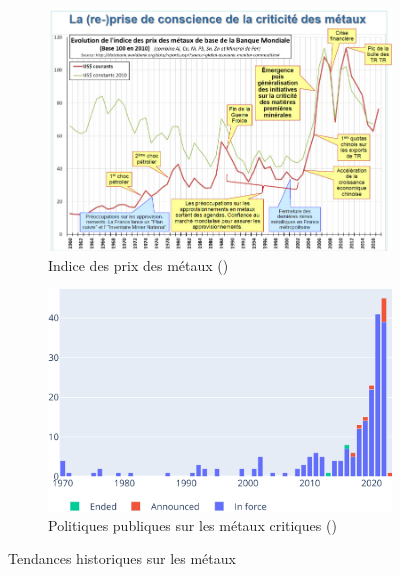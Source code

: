 \begin{figure}[!b]
    \centering
    \begin{subfigure}[b]{0.48\textwidth}
        \centering
         \includegraphics[width=\textwidth]{Images/Metals_policies/indice_metal.jpg}
         \caption{Indice des prix des métaux (\cite{brgm_substances_2022})}
         \label{fig:indices_metal}
    \end{subfigure}
    \hfill
    \begin{subfigure}[b]{0.48\textwidth}
        \centering
         \includegraphics[width=\textwidth]{Images/Metals_policies/critical_metals_policies.png}
         \caption{Politiques publiques sur les métaux critiques (\cite{iea_critical_2022})}
         \label{fig:politiques_metal}
    \end{subfigure}
    \caption{Tendances historiques sur les métaux}
    \label{fig:metal_histoire}
\end{figure}
